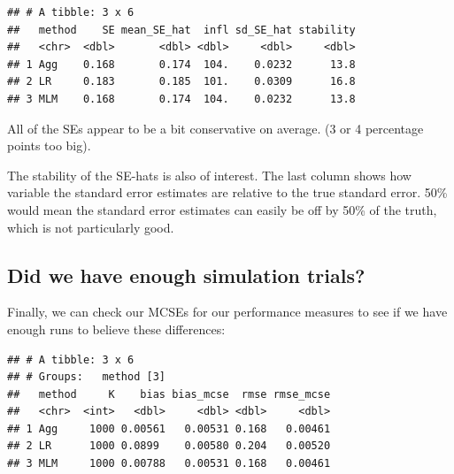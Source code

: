 \documentclass[
]{book}
\newenvironment{Shaded}{\begin{snugshade}}{\end{snugshade}}
\newcommand{\AttributeTok}[1]{\textcolor[rgb]{0.77,0.63,0.00}{#1}}
\newcommand{\FunctionTok}[1]{\textcolor[rgb]{0.00,0.00,0.00}{#1}}
\newcommand{\NormalTok}[1]{#1}
\newcommand{\OtherTok}[1]{\textcolor[rgb]{0.56,0.35,0.01}{#1}}
\newcommand{\SpecialCharTok}[1]{\textcolor[rgb]{0.00,0.00,0.00}{#1}}
\newcommand{\StringTok}[1]{\textcolor[rgb]{0.31,0.60,0.02}{#1}}
\begin{document}
\begin{verbatim}
## # A tibble: 3 x 6
##   method    SE mean_SE_hat  infl sd_SE_hat stability
##   <chr>  <dbl>       <dbl> <dbl>     <dbl>     <dbl>
## 1 Agg    0.168       0.174  104.    0.0232      13.8
## 2 LR     0.183       0.185  101.    0.0309      16.8
## 3 MLM    0.168       0.174  104.    0.0232      13.8
\end{verbatim}

All of the SEs appear to be a bit conservative on average. (3 or 4 percentage points too big).

The stability of the SE-hats is also of interest.
The last column shows how variable the standard error estimates are relative to the true standard error.
50\% would mean the standard error estimates can easily be off by 50\% of the truth, which is not particularly good.

\hypertarget{did-we-have-enough-simulation-trials}{%
\subsection{Did we have enough simulation trials?}\label{did-we-have-enough-simulation-trials}}

Finally, we can check our MCSEs for our performance measures to see if we have enough runs to believe these differences:

\begin{Shaded}
\end{Shaded}

\begin{verbatim}
## # A tibble: 3 x 6
## # Groups:   method [3]
##   method     K    bias bias_mcse  rmse rmse_mcse
##   <chr>  <int>   <dbl>     <dbl> <dbl>     <dbl>
## 1 Agg     1000 0.00561   0.00531 0.168   0.00461
## 2 LR      1000 0.0899    0.00580 0.204   0.00520
## 3 MLM     1000 0.00788   0.00531 0.168   0.00461
\end{verbatim}
\end{document}
